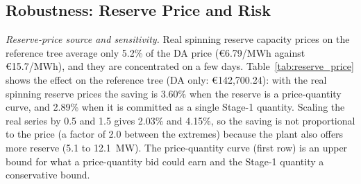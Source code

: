 \documentclass[5p,times,twocolumn]{elsarticle}
\begin{document}
\begin{table}[t]
\caption{Production-coupling value on several real trees (EUR; \% of integrated cost; plan A unless stated). ``Curve'' = reserve as price-quantity curve, ``Stage-1'' = single quantity.}
\label{tab:coupling_dates}
\centering
\scriptsize
\setlength{\tabcolsep}{2.5pt}
\end{table}

\subsection{Robustness: Reserve Price and Risk}
\label{sec:robustness}
\textit{Reserve-price source and sensitivity.} Real spinning reserve capacity prices on the reference tree average only 5.2\% of the DA price (\euro 6.79/MWh against \euro 15.7/MWh), and they are concentrated on a few days. Table~\ref{tab:reserve_price} shows the effect on the reference tree (DA only: \euro 142,700.24): with the real spinning reserve prices the saving is 3.60\% when the reserve is a price-quantity curve, and 2.89\% when it is committed as a single Stage-1 quantity. Scaling the real series by 0.5 and 1.5 gives 2.03\% and 4.15\%, so the saving is not proportional to the price (a factor of 2.0 between the extremes) because the plant also offers more reserve (5.1 to 12.1~MW). The price-quantity curve (first row) is an upper bound for what a price-quantity bid could earn and the Stage-1 quantity a conservative bound.
\end{document}
